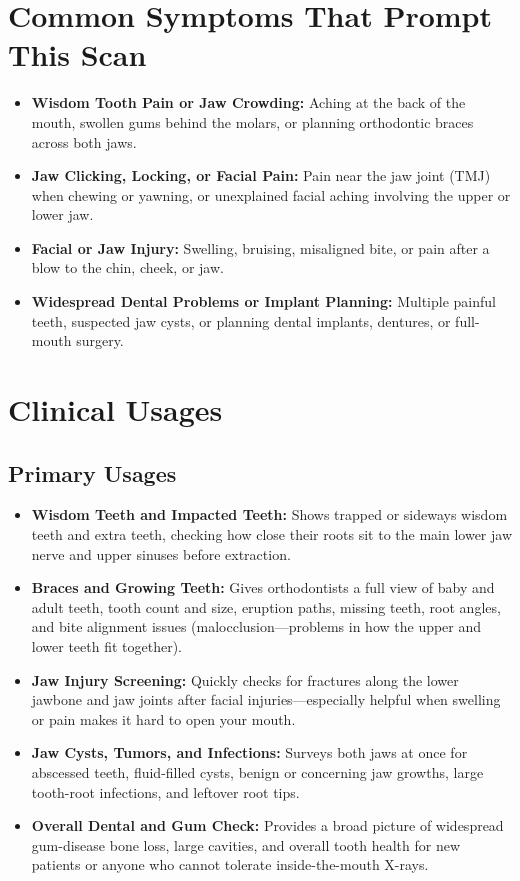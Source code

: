 \section{Common Symptoms That Prompt This Scan}
\begin{itemize}
\item \textbf{Wisdom Tooth Pain or Jaw Crowding:} Aching at the back of the mouth, swollen gums behind the molars, or planning orthodontic braces across both jaws.
\item \textbf{Jaw Clicking, Locking, or Facial Pain:} Pain near the jaw joint (TMJ) when chewing or yawning, or unexplained facial aching involving the upper or lower jaw.
\item \textbf{Facial or Jaw Injury:} Swelling, bruising, misaligned bite, or pain after a blow to the chin, cheek, or jaw.
\item \textbf{Widespread Dental Problems or Implant Planning:} Multiple painful teeth, suspected jaw cysts, or planning dental implants, dentures, or full-mouth surgery.
\end{itemize}

\section{Clinical Usages}

\subsection{Primary Usages}
\begin{itemize}
\item \textbf{Wisdom Teeth and Impacted Teeth:} Shows trapped or sideways wisdom teeth and extra teeth, checking how close their roots sit to the main lower jaw nerve and upper sinuses before extraction.
\item \textbf{Braces and Growing Teeth:} Gives orthodontists a full view of baby and adult teeth, tooth count and size, eruption paths, missing teeth, root angles, and bite alignment issues (malocclusion---problems in how the upper and lower teeth fit together).
\item \textbf{Jaw Injury Screening:} Quickly checks for fractures along the lower jawbone and jaw joints after facial injuries---especially helpful when swelling or pain makes it hard to open your mouth.
\item \textbf{Jaw Cysts, Tumors, and Infections:} Surveys both jaws at once for abscessed teeth, fluid-filled cysts, benign or concerning jaw growths, large tooth-root infections, and leftover root tips.
\item \textbf{Overall Dental and Gum Check:} Provides a broad picture of widespread gum-disease bone loss, large cavities, and overall tooth health for new patients or anyone who cannot tolerate inside-the-mouth X-rays.
\end{itemize}

